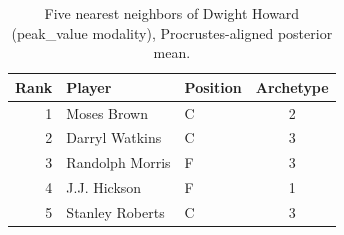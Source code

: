 \begin{table}[htbp]
  \centering\small
  \begin{tabular}{rllc}
    \toprule
    Rank & Player & Position & Archetype \\
    \midrule
    1 & Moses Brown & C & 2 \\
    2 & Darryl Watkins & C & 3 \\
    3 & Randolph Morris & F & 3 \\
    4 & J.J. Hickson & F & 1 \\
    5 & Stanley Roberts & C & 3 \\
    \bottomrule
  \end{tabular}
  \caption{Five nearest neighbors of Dwight Howard (peak_value modality), Procrustes-aligned posterior mean.}
  \label{tab:Dwight_Howard_neighbors_peak_value}
\end{table}


